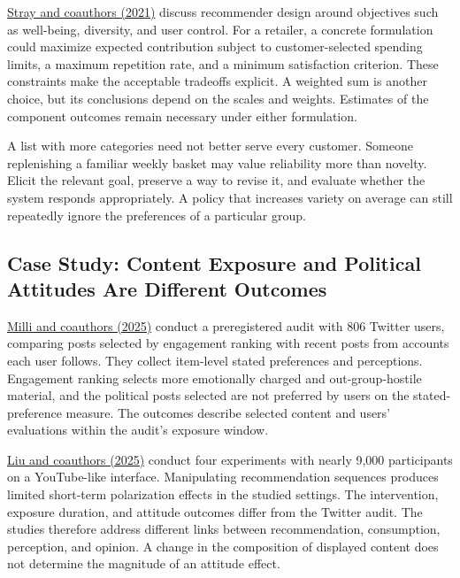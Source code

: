 \href{https://arxiv.org/abs/2107.10939v1}{Stray and coauthors (2021)}
discuss recommender design around objectives such as well-being,
diversity, and user control. For a retailer, a concrete formulation
could maximize expected contribution subject to customer-selected
spending limits, a maximum repetition rate, and a minimum satisfaction
criterion. These constraints make the acceptable tradeoffs explicit. A
weighted sum is another choice, but its conclusions depend on the scales
and weights. Estimates of the component outcomes remain necessary under
either formulation.

A list with more categories need not better serve every customer.
Someone replenishing a familiar weekly basket may value reliability more
than novelty. Elicit the relevant goal, preserve a way to revise it, and
evaluate whether the system responds appropriately. A policy that
increases variety on average can still repeatedly ignore the preferences
of a particular group.

\hypertarget{M08-case-study-content-exposure-and-political-attitudes-are-different-outcomes}{%
\subsection{Case Study: Content Exposure and Political Attitudes Are
Different
Outcomes}\label{M08-case-study-content-exposure-and-political-attitudes-are-different-outcomes}}

\noindent \href{https://doi.org/10.1093/pnasnexus/pgaf062}{Milli and coauthors
(2025)} conduct a preregistered audit with 806 Twitter users, comparing
posts selected by engagement ranking with recent posts from accounts
each user follows. They collect item-level stated preferences and
perceptions. Engagement ranking selects more emotionally charged and
out-group-hostile material, and the political posts selected are not
preferred by users on the stated-preference measure. The outcomes
describe selected content and users' evaluations within the audit's
exposure window.

\href{https://doi.org/10.1073/pnas.2318127122}{Liu and coauthors (2025)}
conduct four experiments with nearly 9,000 participants on a
YouTube-like interface. Manipulating recommendation sequences produces
limited short-term polarization effects in the studied settings. The
intervention, exposure duration, and attitude outcomes differ from the
Twitter audit. The studies therefore address different links between
recommendation, consumption, perception, and opinion. A change in the
composition of displayed content does not determine the magnitude of an
attitude effect.


